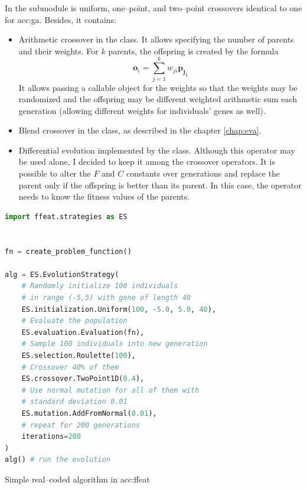 In the  submodule is uniform, one--point, and two--point crossovers identical to one for \acrshort{acc:ga}. Besides, it contains:
\begin{itemize}
    \item Arithmetic crossover in the  class. It allows specifying the number of parents and their weights. For $k$ parents, the offspring is created by the formula 
    $$\mathbf{o}_i=\sum_{j=1}^k w_{ji}\mathbf{p_j}_i$$
    It allows passing a callable object for the weights so that the weights may be randomized and the offspring may be different weighted arithmetic sum each generation (allowing different weights for individuals' genes as well).
    \item Blend crossover in the  class, as described in the chapter \ref{chap:eva}.
    \item Differential evolution implemented by the  class. Although this operator may be used alone, I decided to keep it among the crossover operators. It is possible to alter the $F$ and $C$ constants over generations and replace the parent only if the offspring is better than its parent. In this case, the operator needs to know the fitness values of the parents.
\end{itemize}

\begin{algorithm}[b!]
\begin{lstlisting}[language=Python, xrightmargin=18pt]
import ffeat.strategies as ES


fn = create_problem_function()

alg = ES.EvolutionStrategy(
    # Randomly initialize 100 individuals 
    # in range (-5,5) with gene of length 40
    ES.initialization.Uniform(100, -5.0, 5.0, 40),
    # Evaluate the population
    ES.evaluation.Evaluation(fn),
    # Sample 100 individuals into new generation
    ES.selection.Roulette(100),
    # Crossover 40% of them
    ES.crossover.TwoPoint1D(0.4),
    # Use normal mutation for all of them with 
    # standard deviation 0.01
    ES.mutation.AddFromNormal(0.01),
    # repeat for 200 generations
    iterations=200
)
alg() # run the evolution
\end{lstlisting}
\caption{Simple real--coded algorithm in \acrshort*{acc:ffeat}}
\label{alg:esffeat}
\end{algorithm}

